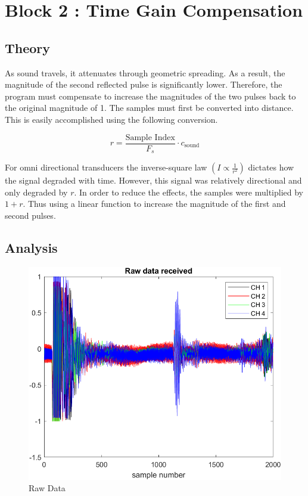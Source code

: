 \section{Block 2 : Time Gain Compensation}

    \subsection{Theory}
    As sound travels, it attenuates through geometric spreading.  As a result, the magnitude of the second reflected pulse is significantly lower. Therefore, the program must compensate to increase the magnitudes of the two pulses back to the original magnitude of 1. 
    The samples must first be converted into distance. This is easily accomplished using the following conversion.
    
    \begin{equation}
        r = \frac{\text{Sample Index}}{F_s} \cdot c_{\text{sound}}
        \label{eq:distanceTGC}
    \end{equation}
    
    

    For omni directional transducers the inverse-square law $(I \propto  \frac{1} {r^2} )$ dictates how the signal degraded with time. However, this signal was relatively directional and only degraded by $r$. In order to reduce the effects, the samples were multiplied by $1 + r$. Thus using a linear function to increase the magnitude of the first and second pulses.  


    \subsection{Analysis}

    \begin{figure}[H]
        \centering
        \includegraphics[width=0.5\linewidth]{figures/rawData.png}
        \caption{Raw Data}
        \label{fig:raw_data}
    \end{figure}

